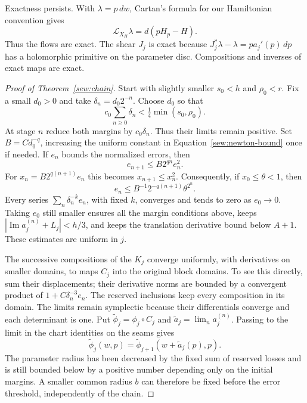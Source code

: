 Exactness persists.  With $\lambda=p\,dw$, Cartan's formula for our
Hamiltonian convention gives
\[
                  \mathcal L_{X_H}\lambda=d(pH_p-H).
\]
Thus the flows are exact.  The shear $J_j$ is exact because
$J_j^*\lambda-\lambda=p a_j'(p)\,dp$ has a holomorphic primitive
on the parameter disc.  Compositions and inverses of exact maps are
exact.

\begin{proof}[Proof of Theorem~\ref{sew:chain}]
Start with slightly smaller $s_0<h$ and $\rho_0<r$.  Fix a small
$d_0>0$ and take $\delta_n=d_0 2^{-n}$.  Choose $d_0$ so that
\[
 c_0\sum_{n\geq0}\delta_n
                   <\tfrac14\min(s_0,\rho_0).
\]
At stage $n$ reduce both margins by $c_0\delta_n$.  Thus their
limits remain positive.  Set $B=C d_0^{-q}$, increasing the uniform
constant in Equation~\eqref{sew:newton-bound} once if needed.  If
$e_n$ bounds the normalized errors, then
\[
 e_{n+1}\leq B2^{qn}e_n^2.
\]
For $x_n=B2^{q(n+1)}e_n$ this becomes $x_{n+1}\leq x_n^2$.
Consequently, if $x_0\leq\theta<1$, then
\[
 e_n\leq B^{-1}2^{-q(n+1)}\theta^{2^n}.
\]
Every series $\sum_n\delta_n^{-k}e_n$, with fixed $k$, converges
and tends to zero as $e_0\to0$.  Taking $e_0$ still smaller ensures
all the margin conditions above, keeps
$|\operatorname{Im}a_j^{(n)}+L_j|<h/3$, and keeps the translation
derivative bound below $A+1$.  These estimates are uniform in $j$.

The successive compositions of the $K_j$ converge uniformly, with
derivatives on smaller domains, to maps $C_j$ into the original
block domains.  To see this directly, sum their displacements;
their derivative norms are bounded by a convergent product of
$1+C\delta_n^{-3}e_n$.  The reserved inclusions keep every
composition in its domain.  The limits remain symplectic because
their differentials converge and each determinant is one.  Put
$\widetilde\phi_j=\phi_j\circ C_j$ and
$\widetilde a_j=\lim_n a_j^{(n)}$.  Passing to the limit in the
chart identities on the seams gives
\[
 \widetilde\phi_j(w,p)=
       \widetilde\phi_{j+1}(w+\widetilde a_j(p),p).
\]
The parameter radius has been decreased by the fixed sum of reserved
losses and is still bounded below by a positive number depending only
on the initial margins. A smaller common radius $b$ can therefore be
fixed before the error threshold, independently of the chain.


\end{proof}
